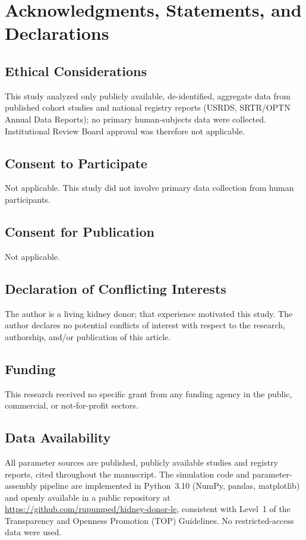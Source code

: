 \section{Acknowledgments, Statements, and Declarations}
\label{sec:acks-declarations}

\subsection*{Ethical Considerations}
This study analyzed only publicly available, de-identified, aggregate data from published cohort studies and national registry reports (USRDS, SRTR/OPTN Annual Data Reports); no primary human-subjects data were collected. Institutional Review Board approval was therefore not applicable.

\subsection*{Consent to Participate}
Not applicable. This study did not involve primary data collection from human participants.

\subsection*{Consent for Publication}
Not applicable.

\subsection*{Declaration of Conflicting Interests}
The author is a living kidney donor; that experience motivated this study. The author declares no potential conflicts of interest with respect to the research, authorship, and/or publication of this article.

\subsection*{Funding}
This research received no specific grant from any funding agency in the public, commercial, or not-for-profit sectors.

\subsection*{Data Availability}
All parameter sources are published, publicly available studies and registry reports, cited throughout the manuscript. The simulation code and parameter-assembly pipeline are implemented in Python~3.10 (NumPy, pandas, matplotlib) and openly available in a public repository at \url{https://github.com/rupumped/kidney-donor-le}, consistent with Level~1 of the Transparency and Openness Promotion (TOP) Guidelines. No restricted-access data were used.

